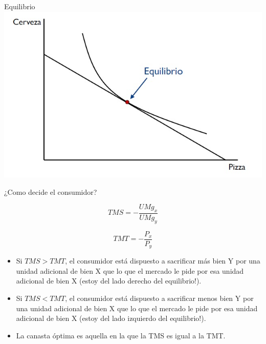 \documentclass{beamer}
\begin{document}
\begin{frame}{Equilibrio}
    \centering
    \includegraphics[scale=0.65]{../Figures/Tema_02.19_rp17.jpg}
\end{frame}

\begin{frame}{¿Como decide el consumidor?}
    
    \[TMS = - \frac{UMg_x}{UMg_y}\]
    
    \[TMT = - \frac{P_x}{P_y}\]

    \begin{itemize}
        \item Si $TMS > TMT$, el consumidor está dispuesto a sacrificar más bien Y por una unidad adicional de bien X que lo que el mercado le pide por esa unidad adicional de bien X (estoy del lado derecho del equilibrio!).
        \item Si $TMS < TMT$, el consumidor está dispuesto a sacrificar menos bien Y por una unidad adicional de bien X que lo que el mercado le pide por esa unidad adicional de bien X (estoy del lado izquierdo del equilibrio!).
        \item La canasta óptima es aquella en la que la TMS es igual a la TMT.
    \end{itemize}
\end{frame}
    
\end{document}
